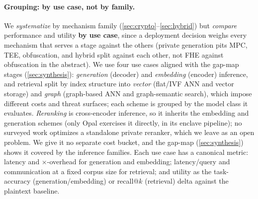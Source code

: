\paragraph{Grouping: by use case, not by family.}
We \emph{systematize} by mechanism family (\cref{sec:crypto}--\cref{sec:hybrid}) but
\emph{compare} performance and utility \textbf{by use case}, since a deployment decision weighs
every mechanism that serves a stage against the others (private generation pits MPC, TEE,
obfuscation, and hybrid split against each other, not FHE against obfuscation in the abstract).
We use four use cases aligned with the gap-map stages (\cref{sec:synthesis}): \emph{generation}
(decoder) and \emph{embedding} (encoder) inference, and retrieval split by index structure into
\emph{vector} (flat/IVF ANN and vector storage) and \emph{graph} (graph-based ANN and
graph-semantic search), which impose different costs and threat surfaces; each scheme is grouped
by the model class it evaluates. \emph{Reranking} is cross-encoder inference, so it inherits the embedding and generation
schemes (only Opal exercises it directly, in its enclave pipeline); no surveyed work optimizes a
standalone private reranker, which we leave as an open problem. We give it no separate cost
bucket, and the gap-map (\cref{sec:synthesis}) shows it covered by the inference families. Each use case has a
canonical metric: latency and $\times$-overhead for generation and embedding; latency/query and
communication at a fixed corpus size for retrieval; and utility as the task-accuracy
(generation/embedding) or recall@$k$ (retrieval) delta against the plaintext baseline.
